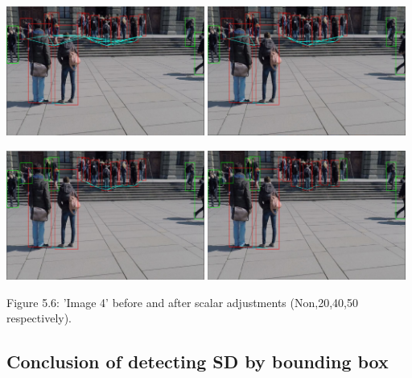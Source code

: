 \documentclass[12pt]{report}
\begin{document}
\begin{center}
	\includegraphics[width=65mm]{./images/appendix/BeforeThresholdScale.JPG}
	\includegraphics[width=65mm]{./images/appendix/AfterThresholdScale.JPG}
	
	\includegraphics[width=65mm]{./images/appendix/AfterThresholdScale40.JPG}
	\includegraphics[width=65mm]{./images/appendix/AfterThresholdScale50.JPG}
	
	{\footnotesize Figure 5.6: 'Image 4' before and after scalar adjustments (Non,20,40,50 respectively).}
\end{center}

\subsection*{Conclusion of detecting SD by bounding box}
\end{document}

